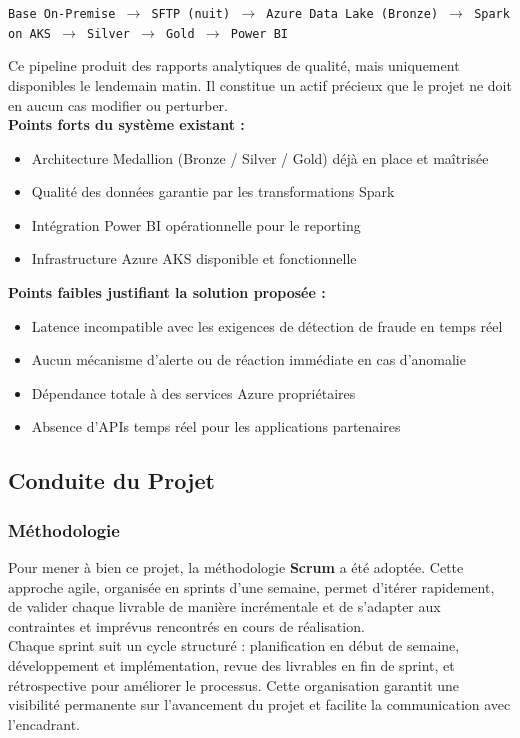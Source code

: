 \vspace{0.2cm}
\begin{center}
\texttt{Base On-Premise $\rightarrow$ SFTP (nuit) $\rightarrow$ Azure Data Lake (Bronze) $\rightarrow$ Spark on AKS $\rightarrow$ Silver $\rightarrow$ Gold $\rightarrow$ Power BI}
\end{center}
\vspace{0.2cm}

Ce pipeline produit des rapports analytiques de qualité, mais uniquement disponibles le lendemain matin. Il constitue un actif précieux que le projet ne doit en aucun cas modifier ou perturber.
\\[0.3cm]
\textbf{Points forts du système existant :}
\begin{itemize}
    \item Architecture Medallion (Bronze / Silver / Gold) déjà en place et maîtrisée
    \item Qualité des données garantie par les transformations Spark
    \item Intégration Power BI opérationnelle pour le reporting
    \item Infrastructure Azure AKS disponible et fonctionnelle
\end{itemize}

\textbf{Points faibles justifiant la solution proposée :}
\begin{itemize}
    \item Latence incompatible avec les exigences de détection de fraude en temps réel
    \item Aucun mécanisme d'alerte ou de réaction immédiate en cas d'anomalie
    \item Dépendance totale à des services Azure propriétaires
    \item Absence d'APIs temps réel pour les applications partenaires
\end{itemize}

\newpage

\subsection{Conduite du Projet}
\vspace{0.5cm}

\subsubsection{Méthodologie}
\vspace{0.3cm}
Pour mener à bien ce projet, la méthodologie \textbf{Scrum} a été adoptée. Cette approche agile, organisée en sprints d'une semaine, permet d'itérer rapidement, de valider chaque livrable de manière incrémentale et de s'adapter aux contraintes et imprévus rencontrés en cours de réalisation.
\\[0.3cm]
Chaque sprint suit un cycle structuré : planification en début de semaine, développement et implémentation, revue des livrables en fin de sprint, et rétrospective pour améliorer le processus. Cette organisation garantit une visibilité permanente sur l'avancement du projet et facilite la communication avec l'encadrant.

